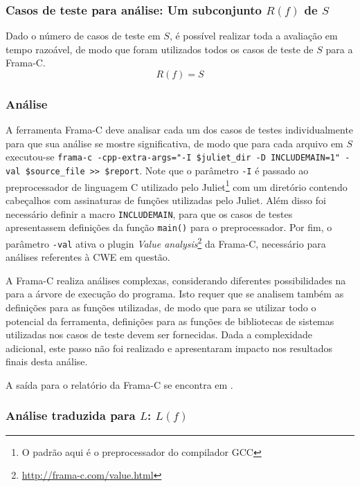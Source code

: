   \subsubsection{Casos de teste para análise: Um subconjunto $R(f)$ de $S$}

  Dado o número de casos de teste em $S$, é possível realizar toda a avaliação em tempo razoável, de modo que foram utilizados todos os casos de teste de $S$ para a Frama-C.
  \begin{equation}
    R(f) = S
  \end{equation}

  \subsubsection{Análise}

  A ferramenta Frama-C deve analisar cada um dos casos de testes individualmente para que sua análise se mostre significativa, de modo que para cada arquivo em $S$ executou-se
  \lstinline[mathescape=false]{frama-c -cpp-extra-args="-I $juliet_dir -D INCLUDEMAIN=1" -val $source_file >> $report}.
  Note que o parâmetro \lstinline{-I} é passado ao preprocessador de linguagem C utilizado pelo Juliet\footnote{O padrão aqui é o preprocessador do compilador GCC} com um diretório contendo cabeçalhos com assinaturas de funções utilizadas pelo Juliet. Além disso foi necessário definir a macro \lstinline{INCLUDEMAIN}, para que os casos de testes apresentassem definições da função \lstinline{main()} para o preprocessador. Por fim, o parâmetro \lstinline{-val} ativa o plugin \textit{Value analysis}\footnote{\url{http://frama-c.com/value.html}} da Frama-C, necessário para análises referentes à CWE em questão.

  A Frama-C realiza análises complexas, considerando diferentes possibilidades na para a árvore de execução do programa. Isto requer que se analisem também as definições para as funções utilizadas, de modo que para se utilizar todo o potencial da ferramenta, definições para as funções de bibliotecas de sistemas utilizadas nos casos de teste devem ser fornecidas. Dada a complexidade adicional, este passo não foi realizado e apresentaram impacto nos resultados finais desta análise.

  A saída para o relatório da Frama-C se encontra em .

  \subsubsection{Análise traduzida para $L$: $L(f)$}

